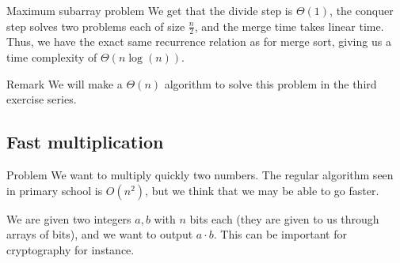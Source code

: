 \documentclass[a4paper]{article}
\begin{document}
\begin{parag}{Maximum subarray problem}
    We get that the divide step is $\Theta\left(1\right)$, the conquer step solves two problems each of size $\frac{n}{2}$, and the merge time takes linear time. Thus, we have the exact same recurrence relation as for merge sort, giving us a time complexity of $\Theta\left(n\log\left(n\right)\right)$.

    \begin{subparag}{Remark}
        We will make a $\Theta\left(n\right)$ algorithm to solve this problem in the third exercise series.
    \end{subparag}
    
\end{parag}

\subsection{Fast multiplication}
\begin{parag}{Problem}
    We want to multiply quickly two numbers. The regular algorithm seen in primary school is $O\left(n^2\right)$, but we think that we may be able to go faster.

    We are given two integers $a, b$ with $n$ bits each (they are given to us through arrays of bits), and we want to output $a\cdot b$. This can be important for cryptography for instance.
\end{parag}
\end{document}
